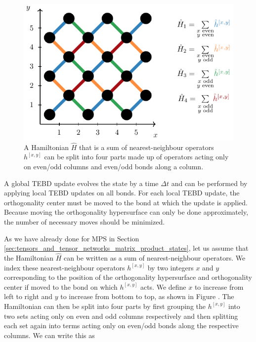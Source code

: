 \begin{figure}
	\centering
	\includegraphics[scale=1]{figures/tikz/YB_isoTPS/tebd_global_update/tebd_global_update_a.pdf}
	\caption{A Hamiltonian $\hat{H}$ that is a sum of nearest-neighbour operators $h^{[x,y]}$ can be split into four parts made up of operators acting only on even/odd columns and even/odd bonds along a column.}
	\label{fig:YB_isoTPS_TEBD_global_update_TEBD1_splitting_and_TEBD2_chain}
\end{figure}
A global TEBD update evolves the state by a time $\Delta t$ and can be performed by applying local TEBD updates on all bonds. For each local TEBD update, the orthogonality center must be moved to the bond at which the update is applied. Because moving the orthogonality hypersurface can only be done approximately, the number of necessary moves should be minimized. \par
As we have already done for MPS in Section \ref{sec:tensors_and_tensor_networks_matrix_product_states}, let us assume that the Hamiltonian $\hat{H}$ can be written as a sum of nearest-neighbour operators. We index these nearest-neighbour operators $h^{[x, y]}$ by two integers $x$ and $y$ corresponding to the position of the orthogonality hypersurface and orthogonality center if moved to the bond on which $h^{[x,y]}$ acts. We define $x$ to increase from left to right and $y$ to increase from bottom to top, as shown in Figure . The Hamiltonian can then be split into four parts by first grouping the $h^{[x,y]}$ into two sets acting only on even and odd columns respectively and then splitting each set again into terms acting only on even/odd bonds along the respective columns. We can write this as
